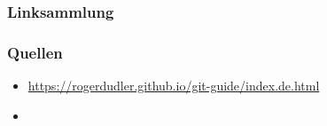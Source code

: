 \documentclass{beamer}
\begin{document}
\begin{frame}
\frametitle{Linksammlung}

\end{frame}

\begin{frame}
\frametitle{Quellen}

\begin{itemize}
    \item[] \url{https://rogerdudler.github.io/git-guide/index.de.html}
    \item[] 
\end{itemize}


\end{frame}
\end{document}

